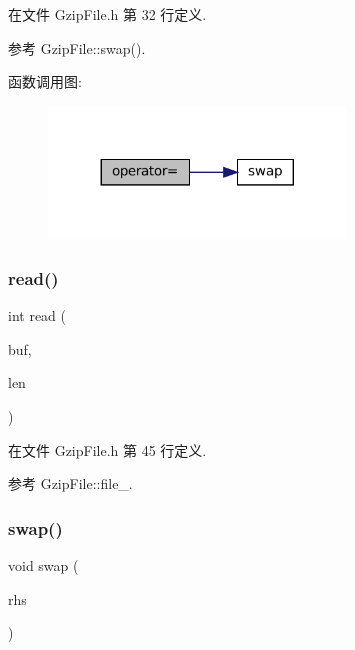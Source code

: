 在文件 Gzip\+File.\+h 第 32 行定义.



参考 Gzip\+File\+::swap().

函数调用图\+:
\nopagebreak
\begin{figure}[H]
\begin{center}
\leavevmode
\includegraphics[width=224pt]{classmuduo_1_1GzipFile_a8dddcc232bc559a7ced99ef5f05689b4_cgraph}
\end{center}
\end{figure}
\mbox{\label{classmuduo_1_1GzipFile_a3246bad9b6760a10a502669da1264746}} 
\subsubsection{\texorpdfstring{read()}{read()}}
{\footnotesize\ttfamily int read (\begin{DoxyParamCaption}\item[{void $\ast$}]{buf,  }\item[{int}]{len }\end{DoxyParamCaption})\hspace{0.3cm}{\ttfamily [inline]}}



在文件 Gzip\+File.\+h 第 45 行定义.



参考 Gzip\+File\+::file\+\_\+.

\mbox{\label{classmuduo_1_1GzipFile_a545d0ac9e0b6d92ec76093784b550cb2}} 
\subsubsection{\texorpdfstring{swap()}{swap()}}
{\footnotesize\ttfamily void swap (\begin{DoxyParamCaption}\item[{\hyperlink{classmuduo_1_1GzipFile}{Gzip\+File} \&}]{rhs }\end{DoxyParamCaption})\hspace{0.3cm}{\ttfamily [inline]}}



